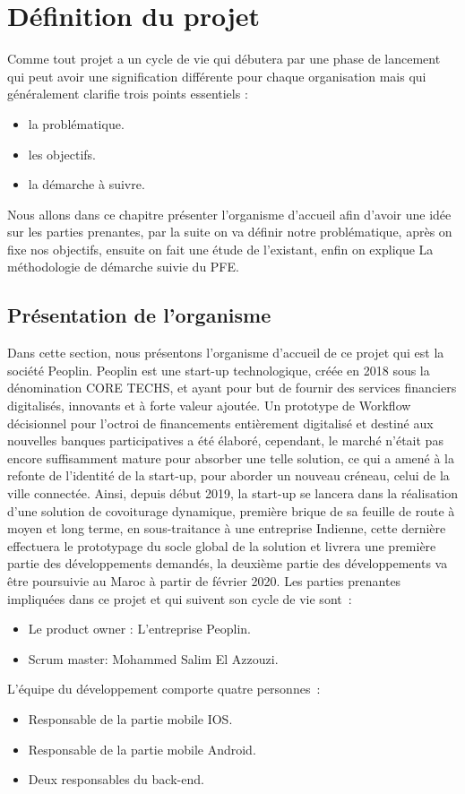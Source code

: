 \chapter{Définition du projet}

Comme tout projet a un cycle de vie qui débutera par une phase de lancement qui peut avoir une signification différente pour chaque organisation mais qui généralement clarifie trois points essentiels :
\begin{itemize}
	\item la problématique.
	\item les objectifs.
	\item la démarche à suivre.
\end{itemize}
Nous allons dans ce chapitre présenter l'organisme d’accueil afin d'avoir une idée sur les parties prenantes, par la suite on va définir notre problématique, après on fixe nos objectifs, ensuite on fait une étude de l'existant, enfin on explique La méthodologie de démarche suivie du PFE.


\section{Présentation de l’organisme}

Dans cette section, nous présentons l’organisme d’accueil de ce projet qui est la société Peoplin.\newline
Peoplin est une start-up technologique, créée en 2018 sous la dénomination CORE TECHS, et ayant pour but de fournir des services financiers digitalisés, innovants et à forte valeur ajoutée. Un prototype de Workflow décisionnel pour l’octroi de financements entièrement digitalisé et destiné aux nouvelles banques participatives a été élaboré, cependant, le marché n’était pas encore suffisamment mature pour absorber une telle solution, ce qui a amené à la refonte de l’identité de la start-up, pour aborder un nouveau créneau, celui de la ville connectée.\newline 
Ainsi, depuis début 2019, la start-up se lancera dans la réalisation d’une solution de covoiturage dynamique, première brique de sa feuille de route à moyen et long terme, en sous-traitance à une entreprise Indienne, cette dernière effectuera le prototypage du socle global de la solution et livrera une première partie des développements demandés, la deuxième partie des développements va être poursuivie au Maroc à partir de février 2020.\newline
Les parties prenantes impliquées dans ce projet et qui suivent son cycle de vie sont : 
\begin{itemize}
	\item Le product owner : L’entreprise Peoplin.
	\item Scrum master: Mohammed Salim El Azzouzi.
\end{itemize}
L’équipe du développement comporte quatre personnes :
\begin{itemize}
	\item Responsable de la partie mobile IOS.
	\item Responsable de la partie mobile Android.
	\item Deux responsables du back-end.
\end{itemize}


